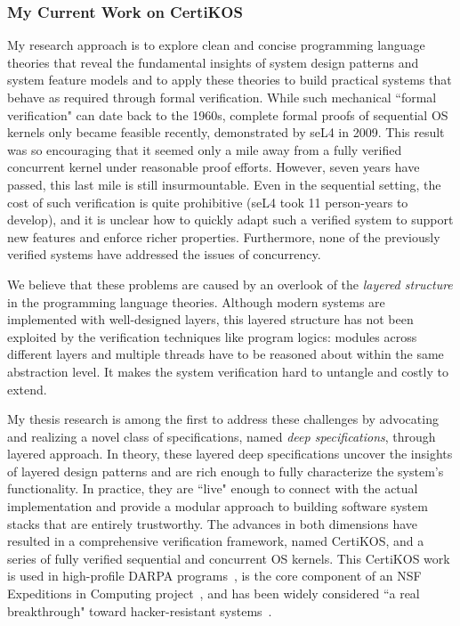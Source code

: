 \documentclass[a4paper, 10pt]{article}
\begin{document}
\begin{small}

\subsubsection*{\large My Current Work on CertiKOS}

My research approach  is to explore clean and concise
programming language theories that 
reveal the fundamental insights of system design patterns
and system feature models and to apply these theories
to build practical systems that behave as required
through formal verification. 
While such mechanical ``formal verification" can date back to the 1960s, 
complete formal proofs of sequential OS kernels only became feasible recently, demonstrated by seL4 in 2009. This result was so encouraging that it seemed only a mile away from a fully verified concurrent kernel under reasonable proof efforts. However, 
seven years have passed,
this last mile is still insurmountable.
Even in the sequential setting, the cost of such verification is quite prohibitive
(seL4 took 11 person-years to develop), and
 it is unclear how to quickly adapt such a verified system to support new features and enforce richer properties. 
Furthermore, none of the previously verified systems have addressed the
issues of concurrency.

 
We believe that these problems
are caused by an overlook of the \emph{layered structure} in the programming language theories.
Although modern systems are implemented with
well-designed layers, this layered structure has not been exploited by the verification techniques like program logics:  modules across different layers and multiple threads have to be reasoned about within 
the same abstraction level. It makes the system verification
hard to untangle
and costly to extend.

My thesis research is among the first to address these challenges
by advocating and realizing a novel class of specifications, named \emph{deep specifications}, through layered approach.
In theory, these layered deep specifications uncover the 
insights of  layered design patterns
and are rich
enough to fully characterize the system's functionality. In practice, they are ``live" enough to  connect   with the actual  implementation and provide a modular approach to building
 software system stacks that are entirely trustworthy.
The advances in both dimensions have resulted in a comprehensive
verification framework, named CertiKOS, and
a series of fully verified sequential and concurrent OS kernels.
This CertiKOS work is used in high-profile DARPA programs~\cite{crash,hacms},
is the core component of an NSF Expeditions in Computing project~\cite{deepspec}, and has been widely considered
 ``a real breakthrough" toward hacker-resistant systems~\cite{news, times, dnews}.



\end{small}
\end{document}
